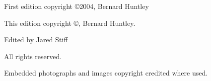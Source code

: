 
\makeatletter
\thispagestyle{empty}
\vspace*{\fill}
\begin{center}
\HUGE \@title
\end{center}
\vspace*{\fill}
\clearpage
\makeatother

\thispagestyle{empty}
\mbox{}
\clearpage

\maketitle
\thispagestyle{empty}
\clearpage

\begingroup
\footnotesize\raggedright
\mbox{}
\vfill
\thispagestyle{empty}
\begin{minipage}[b]{0.9\textwidth}
\setlength{\parskip}{0.5\baselineskip}
First edition copyright \copyright 2004, Bernard Huntley\par
This edition copyright \copyright \the\year , Bernard Huntley.\par
Edited by Jared Stiff\par
\vspace*{2\baselineskip}

All rights reserved.\par
\vspace*{2\baselineskip}

Embedded photographs and images copyright credited where used.

\end{minipage}
\vspace*{2\baselineskip}
\vfill
{}
\endgroup
\clearpage
